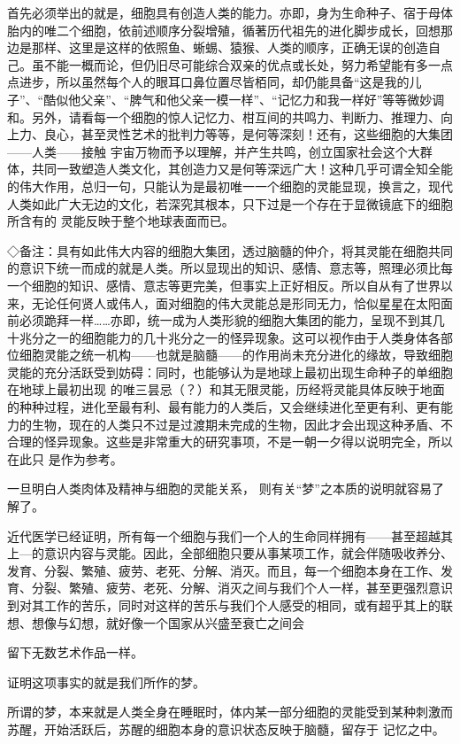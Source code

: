 \documentclass{article}
\begin{document}
首先必须举出的就是，细胞具有创造人类的能力。亦即，身为生命种子、宿于母体胎内的唯二个细胞，依前述顺序分裂增殖，循著历代祖先的进化脚步成长，回想那边是那样、这里是这样的依照鱼、蜥蜴、猿猴、人类的顺序，正确无误的创造自己。虽不能一概而论，但仍旧尽可能综合双亲的优点或长处，努力希望能有多一点点进步，所以虽然每个人的眼耳口鼻位置尽皆栢同，却仍能具备“这是我的儿子”、“酷似他父亲”、“脾气和他父亲一模一样”、“记忆力和我一样好”等等微妙调和。另外，请看每一个细胞的惊人记忆力、柑互间的共鸣力、判断力、推理力、向上力、良心，甚至灵性艺术的批判力等等，是何等深刻！还有，这些细胞的大集团——人类——接触
\newpage
宇宙万物而予以理解，并产生共鸣，创立国家社会这个大群体，共同一致塑造人类文化，其创造力又是何等深远广大！这种几乎可谓全知全能的伟大作用，总归一句，只能认为是最初唯一一个细胞的灵能显现，换言之，现代人类如此广大无边的文化，若深究其根本，只下过是一个存在于显微镜底下的细胞所含有的
灵能反映于整个地球表面而已。 

◇备注：具有如此伟大内容的细胞大集团，透过脑髓的仲介，将其灵能在细胞共同的意识下统一而成的就是人类。所以显现出的知识、感情、意志等，照理必须比每一个细胞的知识、感情、意志等更完美，但事实上正好相反。所以自从有了世界以来，无论任何贤人或伟人，面对细胞的伟大灵能总是形同无力，恰似星星在太阳面前必须跪拜一样……亦即，统一成为人类形貌的细胞大集团的能力，呈现不到其几十兆分之一的细胞能力的几十兆分之一的怪异现象。这可以视作由于人类身体各部位细胞灵能之统一机构——也就是脑髓——的作用尚未充分进化的缘故，导致细胞灵能的充分活跃受到妨碍：同时，也能够认为是地球上最初出现生命种子的单细胞在地球上最初出现
\newpage
的唯三昙忌（？）和其无限灵能，历经将灵能具体反映于地面的种种过程，进化至最有利、最有能力的人类后，又会继续进化至更有利、更有能力的生物，现在的人类只不过是过渡期未完成的生物，因此才会出现这种矛盾、不合理的怪异现象。这些是非常重大的研究事项，不是一朝一夕得以说明完全，所以在此只
是作为参考。 

一旦明白人类肉体及精神与细胞的灵能关系，
则有关“梦”之本质的说明就容易了解了。 

近代医学已经证明，所有每一个细胞与我们一个人的生命同样拥有——甚至超越其上—的意识内容与灵能。因此，全部细胞只要从事某项工作，就会伴随吸收养分、发育、分裂、繁殖、疲劳、老死、分解、消灭。而且，每一个细胞本身在工作、发育、分裂、繁殖、疲劳、老死、分解、消灭之间与我们个人一样，甚至更强烈意识到对其工作的苦乐，同时对这样的苦乐与我们个人感受的相同，或有超乎其上的联想、想像与幻想，就好像一个国家从兴盛至衰亡之间会

\newpage
留下无数艺术作品一样。 


证明这项事实的就是我们所作的梦。 

所谓的梦，本来就是人类全身在睡眠时，体内某一部分细胞的灵能受到某种刺激而苏醒，开始活跃后，苏醒的细胞本身的意识状态反映于脑髓，留存于
记忆之中。 
\end{document}
